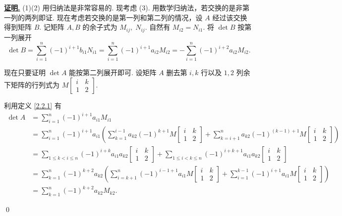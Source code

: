 \documentclass[10pt,openany]{article}
\theoremstyle{thmstyle} %
\theoremstyle{defstyle} %
\theoremstyle{prostyle} %
\theoremstyle{exastyle}
\theoremstyle{remstyle}
\renewenvironment{proof}[1][证明]{\par\underline{\textbf{#1.}} \;\fangsong}{\qed\par}
\begin{document}
\begin{proof}
     (1)(2) 用归纳法是非常容易的. 现考虑 (3). 用数学归纳法，若交换的是非第一列的两列即证. 现在考虑若交换的是第一列和第二列的情况，设 \( A \) 经过该交换得到矩阵 \( B \). 记矩阵 \( A,B \) 的余子式为 \( M_{ij}, \; N_{ij} \). 自然有 \( M_{i2}=N_{i1} \). 将 \( \det B \) 按第一列展开
     \[ \det B= \sum_{i=1}^{n} (-1)^{i+1} b_{i1}N_{i1}= \sum_{i=1}^{n} (-1)^{i+1} a_{i2}M_{i2}= -\sum_{i=1}^{n} (-1)^{i+2} a_{i2}M_{i2}. \]
     
     现在只要证明 \( \det A \) 能按第二列展开即可. 设矩阵 \( A \) 删去第 \( i,k \) 行以及 \( 1,2 \) 列余下矩阵的行列式为 \( M\begin{bmatrix}
     i & k \\ 1 & 2
     \end{bmatrix} \).
     
     利用定义 \ref{2.2.1} 有
     \begin{align*}
     	\det A & = \sum_{i=1}^{n} (-1)^{i+1}a_{i1}M_{i1} \\
     	&= \sum_{i=1}^{n} (-1)^{i+1}a_{i1} \left(\sum_{k=1}^{i-1}a_{k2}(-1)^{k+1}M\begin{bmatrix}
     		i & k \\ 1 & 2
     	\end{bmatrix}+\sum_{k=i+1}^{n}a_{k2}(-1)^{(k-1)+1}M\begin{bmatrix}
     	i & k \\ 1 & 2
     	\end{bmatrix} \right) \\
     	&= \sum_{1 \leq k<i \leq n}^{} (-1)^{i+k} a_{i1}a_{k2} \begin{bmatrix}
     		i & k \\ 1 & 2
     	\end{bmatrix}+ \sum_{1 \leq i<k \leq n}^{}  (-1)^{i+k+1} a_{i1}a_{k2} \begin{bmatrix}
     	i & k \\ 1 & 2
     	\end{bmatrix} \\
     	&= \sum_{k=1}^{n} (-1)^{k+2}a_{k2} \left( \sum_{i=k+1}^{n} (-1)^{i-1+1}a_{i1}M\begin{bmatrix}
     		i & k \\ 1 & 2
     	\end{bmatrix}+ \sum_{i=1}^{k-1}(-1)^{i+1}a_{i1}M\begin{bmatrix}
     	i & k \\ 1 & 2
     	\end{bmatrix} \right) \\
     	&= \sum_{k=1}^{n} (-1)^{k+2}a_{k2}M_{k2}.
     \end{align*}
     

\end{proof}
\end{document}
